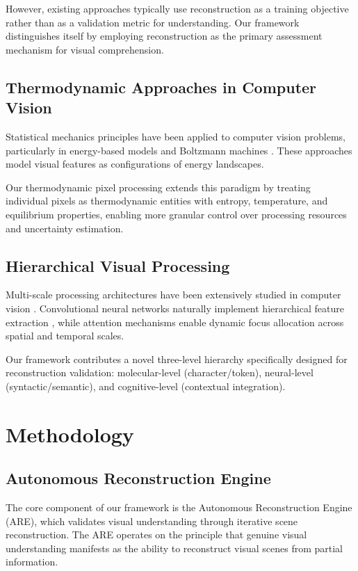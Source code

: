\documentclass[12pt,a4paper]{article}
\begin{document}
However, existing approaches typically use reconstruction as a training objective rather than as a validation metric for understanding. Our framework distinguishes itself by employing reconstruction as the primary assessment mechanism for visual comprehension.

\subsection{Thermodynamic Approaches in Computer Vision}

Statistical mechanics principles have been applied to computer vision problems, particularly in energy-based models \cite{lecun2006tutorial} and Boltzmann machines \cite{hinton2002training}. These approaches model visual features as configurations of energy landscapes.

Our thermodynamic pixel processing extends this paradigm by treating individual pixels as thermodynamic entities with entropy, temperature, and equilibrium properties, enabling more granular control over processing resources and uncertainty estimation.

\subsection{Hierarchical Visual Processing}

Multi-scale processing architectures have been extensively studied in computer vision \cite{adelson1984pyramid, lindeberg1994scale}. Convolutional neural networks naturally implement hierarchical feature extraction \cite{lecun1989backpropagation}, while attention mechanisms \cite{vaswani2017attention} enable dynamic focus allocation across spatial and temporal scales.

Our framework contributes a novel three-level hierarchy specifically designed for reconstruction validation: molecular-level (character/token), neural-level (syntactic/semantic), and cognitive-level (contextual integration).

\section{Methodology}

\subsection{Autonomous Reconstruction Engine}

The core component of our framework is the Autonomous Reconstruction Engine (ARE), which validates visual understanding through iterative scene reconstruction. The ARE operates on the principle that genuine visual understanding manifests as the ability to reconstruct visual scenes from partial information.
\end{document}
